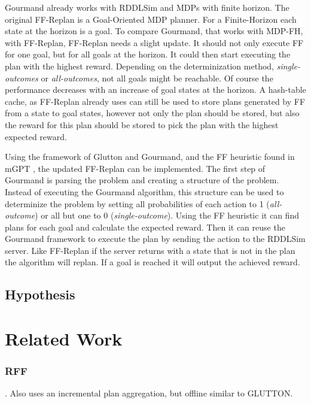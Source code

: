 \documentclass[runningheads,a4paper]{llncs}
\begin{document}
Gourmand already works with RDDLSim and MDPs with finite horizon. The original
FF-Replan is a Goal-Oriented MDP planner. For a Finite-Horizon each state at
the horizon is a goal. To compare Gourmand, that works with MDP-FH, with
FF-Replan, FF-Replan needs a slight update. It should not only execute FF for
one goal, but for all goals at the horizon. It could then start executing the
plan with the highest reward. Depending on the determinization method,
\emph{single-outcomes} or \emph{all-outcomes}, not all goals might be
reachable. Of course the performance decreases with an increase of goal states
at the horizon. A hash-table cache, as FF-Replan already uses can still be used
to store plans generated by FF from a state to goal states, however not only
the plan should be stored, but also the reward for this plan should be stored
to pick the plan with the highest expected reward.

Using the framework of Glutton and Gourmand, and the FF heuristic found in mGPT
\cite{bonet2011mgpt}, the updated FF-Replan can be implemented. The first step
of Gourmand is parsing the problem and creating a structure of the problem.
Instead of executing the Gourmand algorithm, this structure can be used to
determinize the problem by setting all probabilities of each action to 1
(\emph{all-outcome}) or all but one to 0 (\emph{single-outcome}). Using the
FF heuristic it can find plans for each goal and calculate the expected reward.
Then it can reuse the Gourmand framework to execute the plan by sending the
action to the RDDLSim server. Like FF-Replan if the server returns with a state
that is not in the plan the algorithm will replan. If a goal is reached it will
output the achieved reward.

\subsection{Hypothesis}


\section{Related Work}

\subsubsection{RFF}. Also uses an incremental plan aggregation, but offline similar to GLUTTON.
\end{document}
